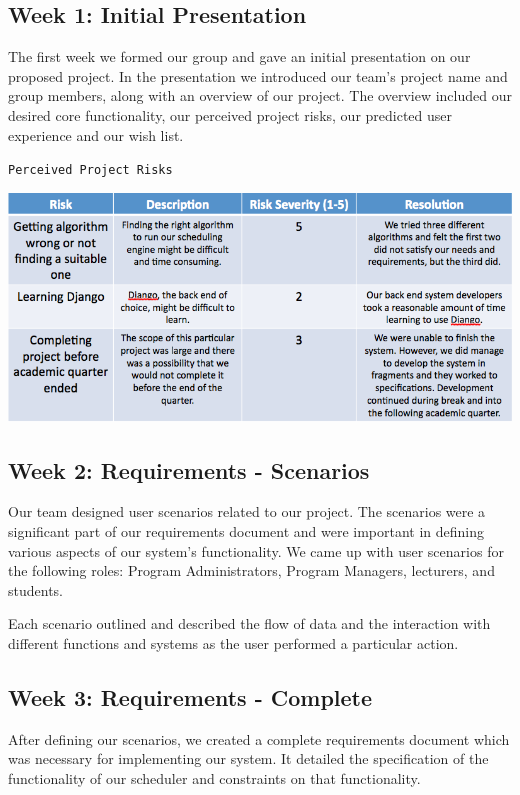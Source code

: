 \documentclass[12pt]{article}
\begin{document}
\subsection*{Week 1: Initial Presentation}

The first week we formed our group and gave an initial presentation on our proposed project. In the presentation we introduced our team's project name and group members, along with an overview of our project. The overview included our desired core functionality, our perceived project risks, our predicted user experience and our wish list. 

\begin{center}\texttt{Perceived Project Risks}\end{center}
\includegraphics[scale=0.45]{risktable.png}

\subsection*{Week 2: Requirements - Scenarios}

Our team designed user scenarios related to our project. The scenarios were a significant part of our requirements document and were important in defining various aspects of our system's functionality. We came up with user scenarios for the following roles: Program Administrators, Program Managers, lecturers, and students. 

Each scenario outlined and described the flow of data and the interaction with different functions and systems as the user performed a particular action. 

\subsection*{Week 3: Requirements - Complete}

After defining our scenarios, we created a complete requirements document which was necessary for implementing our system. It detailed the specification of the functionality of our scheduler and constraints on that functionality. 
\end{document}
